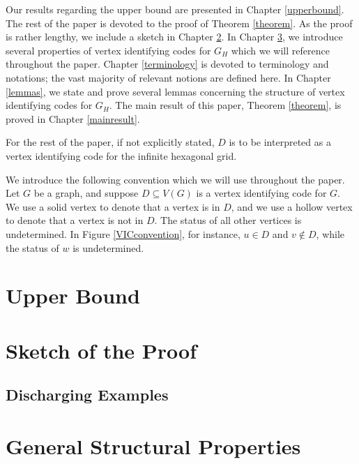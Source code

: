 \documentclass[12pt]{report}
\numberwithin{equation}{chapter}
\theoremstyle{definition}
\theoremstyle{remark}
\begin{document}
Our results regarding the upper bound are presented in Chapter \ref{upperbound}.  The rest of the paper is devoted to the proof of Theorem \ref{theorem}.  As the proof is rather lengthy, we include a sketch in Chapter \ref{sketch}.  In Chapter \ref{general}, we introduce several properties of vertex identifying codes for $G_H$ which we will reference throughout the paper.  Chapter \ref{terminology} is devoted to terminology and notations; the vast majority of relevant notions are defined here.  In Chapter \ref{lemmas}, we state and prove several lemmas concerning the structure of vertex identifying codes for $G_H$.  The main result of this paper, Theorem \ref{theorem}, is proved in Chapter \ref{mainresult}.  

For the rest of the paper, if not explicitly stated, $D$ is to be interpreted as a vertex identifying code for the infinite hexagonal grid.




We introduce the following convention which we will use throughout the paper.  Let $G$ be a graph, and suppose $D \subseteq V(G)$ is a vertex identifying code for $G$.  We use a solid vertex to denote that a vertex is in $D$, and we use a hollow vertex to denote that a vertex is not in $D$.  The status of all other vertices is undetermined.  In Figure \ref{VICconvention}, for instance, $u \in D$ and $v \not \in D$, while the status of $w$ is undetermined.







\chapter{Upper Bound}


\chapter{Sketch of the Proof}
\label{sketch}

\section{Discharging Examples}




\chapter{General Structural Properties}
\label{general}
\end{document}
